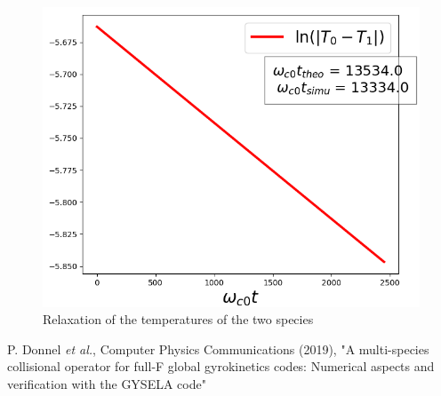 \documentclass[11pt,preprint]{elsarticle}
\begin{document}
\begin{figure}[H]
\caption{Relaxation of the temperatures of the two species\label{fig:Relaxation-T-two-species}}
\centering{}\includegraphics[scale=0.8]{Figures/2_species_temperature.PNG}
\end{figure}

\begin{thebibliography}{1}
     P. Donnel \emph{et al.}, Computer Physics Communications (2019), "A multi-species collisional operator for full-F global gyrokinetics codes: Numerical aspects and verification with the GYSELA code"
\end{thebibliography}
\end{document}
